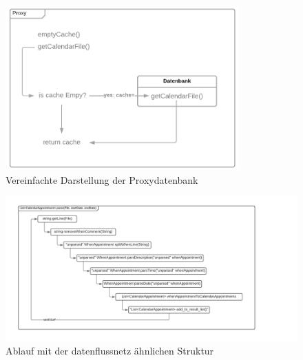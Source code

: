 \begin{figure}
    \centering
    \includegraphics[width=0.8\textwidth]{res/proxy.png} 
    \caption{Vereinfachte Darstellung der Proxydatenbank} 
    \label{pic:proxy}
\end{figure}

\begin{figure}
    \centering
    \includegraphics[width=1.2\textwidth]{res/datenfluss.png} 
    \caption{Ablauf mit der datenflussnetz ähnlichen Struktur} 
    \label{pic:datenfluss}
\end{figure}

